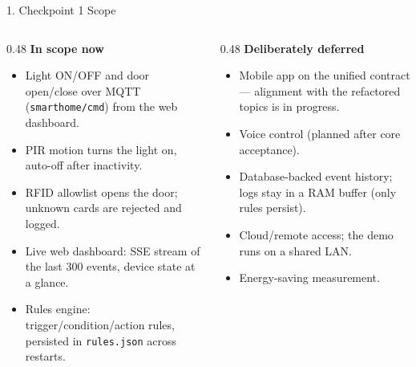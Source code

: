 \documentclass[aspectratio=169,11pt]{beamer}
\begin{document}
\begin{frame}{1. Checkpoint 1 Scope}
  \footnotesize
  \setlength{\parskip}{0.2em}
  \begin{columns}[T,onlytextwidth]
    \begin{column}{0.48\textwidth}
      {\large\bfseries\color{DeepBlue} In scope now}\par
      \begin{itemize}
        \item Light ON/OFF and door open/close over MQTT
          (\texttt{smarthome/cmd}) from the web dashboard.
        \item PIR motion turns the light on, auto-off after inactivity.
        \item RFID allowlist opens the door; unknown cards are rejected and
          logged.
        \item Live web dashboard: SSE stream of the last 300 events, device
          state at a glance.
        \item Rules engine: trigger/condition/action rules, persisted in
          \texttt{rules.json} across restarts.
      \end{itemize}
    \end{column}
    \begin{column}{0.48\textwidth}
      {\large\bfseries\color{DeepBlue} Deliberately deferred}\par
      \begin{itemize}
        \item Mobile app on the unified contract --- alignment with the
          refactored topics is in progress.
        \item Voice control (planned after core acceptance).
        \item Database-backed event history; logs stay in a RAM buffer
          (only rules persist).
        \item Cloud/remote access; the demo runs on a shared LAN.
        \item Energy-saving measurement.
      \end{itemize}
    \end{column}
  \end{columns}
\end{frame}
\end{document}
